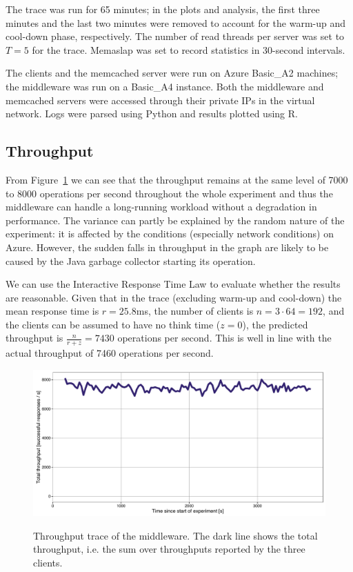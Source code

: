 \documentclass[11pt]{article}
\begin{document}
The trace was run for 65 minutes; in the plots and analysis, the first three minutes and the last two minutes were removed to account for the warm-up and cool-down phase, respectively. The number of read threads per server was set to $T=5$ for the trace. Memaslap was set to record statistics in 30-second intervals.

The clients and the memcached server were run on Azure Basic\_A2 machines; the middleware was run on a Basic\_A4 instance. 
Both the middleware and memcached servers were accessed through their private IPs in the virtual network. Logs were parsed using Python and results plotted using R.



\subsection{Throughput}

From Figure~\ref{fig:rep3:throughput} we can see that the throughput remains at the same level of 7000 to 8000 operations per second throughout the whole experiment and thus the middleware can handle a long-running workload  without a degradation in performance. The variance can partly be explained by the random nature of the experiment: it is affected by the conditions (especially network conditions) on Azure. However, the sudden falls in throughput in the graph are likely to be caused by the Java garbage collector starting its operation.

We can use the Interactive Response Time Law to evaluate whether the results are reasonable. Given that in the trace (excluding warm-up and cool-down) the mean response time is $r=25.8$ms, the number of clients is $n = 3 \cdot 64 = 192$, and the clients can be assumed to have no think time ($z=0$), the predicted throughput is $\frac{n}{r + z} = 7430$ operations per second. This is well in line with the actual throughput of 7460 operations per second.

\begin{figure}[p]
\centering
\includegraphics[width=\textwidth]{../results/trace_rep3/graphs/throughput.pdf}
\label{fig:rep3:throughput}
\caption{Throughput trace of the middleware. The dark line shows the total throughput, i.e. the sum over throughputs reported by the three clients.}
\end{figure}
\end{document}
